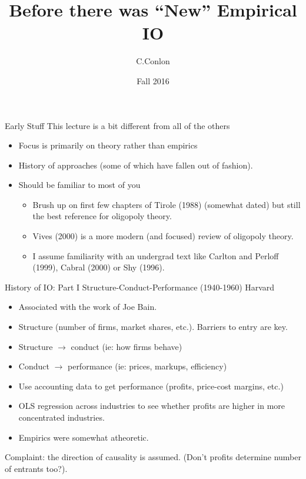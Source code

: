 \documentclass[xcolor=pdftex,dvipsnames,table,mathserif]{beamer}
\title [``Old'' IO]{Before there was ``New'' Empirical IO}
\author{C.Conlon}
\institute{Grad IO }
\date{Fall 2016}
\begin{document}
\begin{frame}
\titlepage
\end{frame}

\begin{frame}{Early Stuff}
This lecture is a bit different from all of the others
\begin{itemize}
\item Focus is primarily on theory rather than empirics
\item History of approaches (some of which have fallen out of fashion).
\item Should be familiar to most of you
\begin{itemize}
\item Brush up on first few chapters of Tirole (1988) (somewhat dated) but still the best reference for oligopoly theory.
\item Vives (2000) is a more modern (and focused) review of oligopoly theory.
\item I assume familiarity with an undergrad text like Carlton and Perloff (1999), Cabral (2000) or Shy (1996).
\end{itemize}
\end{itemize}
\end{frame}


\begin{frame}{History of IO: Part I}
Structure-Conduct-Performance (1940-1960) Harvard
\begin{itemize}
\item Associated with the work of Joe Bain.
\item Structure (number of firms, market shares, etc.). Barriers to entry are key.
\item Structure $\rightarrow$ conduct (ie: how firms behave)
\item Conduct $\rightarrow$ performance (ie: prices, markups, efficiency)
\item Use accounting data to get performance (profits, price-cost margins, etc.)
\item OLS regression across industries to see whether profits are higher in more concentrated industries.
\item Empirics were somewhat atheoretic.
\end{itemize}
Complaint: the direction of causality is assumed. (Don't profits determine number of entrants too?).
\end{frame}
\end{document}
